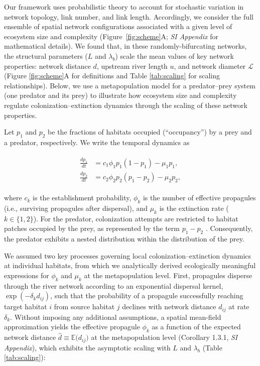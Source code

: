 \documentclass[11pt, class=article, crop=false]{standalone}
\theoremstyle{definition}
\begin{document}
Our framework uses probabilistic theory to account for stochastic variation in network topology, link number, and link length.
Accordingly, we consider the full ensemble of spatial network configurations associated with a given level of ecosystem size and complexity (Figure~\ref{fig:scheme}A; \textit{SI Appendix} for mathematical details). 
We found that, in these randomly-bifurcating networks, the structural parameters ($L$ and $\lambda_b$) scale the mean values of key network properties: network distance $d$, upstream river length $u$, and network diameter $\mathcal{L}$ (Figure \ref{fig:scheme}A for definitions and Table \ref{tab:scaling} for scaling relationships). 
Below, we use a metapopulation model for a predator–prey system (one predator and its prey) to illustrate how ecosystem size and complexity regulate colonization–extinction dynamics through the scaling of these network properties.

Let $p_{1}$ and $p_{2}$ be the fractions of habitats occupied (``occupancy'') by a prey and a predator, respectively.
We write the temporal dynamics as

\begin{align}
\begin{split}
    \frac{dp_{1}}{dt} &= c_1 \phi_1 p_1(1 - p_{1}) - \mu_{1} p_{1},\\
    \frac{dp_{2}}{dt} &= c_2 \phi_2 p_2 (p_{1} - p_{2}) - \mu_{2} p_{2},   
\end{split}
\label{eq:model-pp}
\end{align}

where $c_k$ is the establishment probability, $\phi_{k}$ is the number of effective propagules (i.e., surviving propagules after dispersal), and $\mu_{k}$ is the extinction rate ($k \in \{1,2\}$).
For the predator, colonization attempts are restricted to habitat patches occupied by the prey, as represented by the term $p_{1} - p_{2}$ \citep{holt_food_2002, takimoto_effects_2012, calcagno_constraints_2011}.
Consequently, the predator exhibits a nested distribution within the distribution of the prey.

We assumed two key processes governing local colonization--extinction dynamics at individual habitats, from which we analytically derived ecologically meaningful expressions for $\phi_k$ and $\mu_k$ at the metapopulation level. 
First, propagules disperse through the river network according to an exponential dispersal kernel, $\exp(-\delta_k d_{ij})$, such that the probability of a propagule successfully reaching target habitat $i$ from source habitat $j$ declines with network distance $d_{ij}$ at rate $\delta_k$.
Without imposing any additional assumptions, a spatial mean-field approximation \citep{ovaskainen_asymptotically_2006} yields the effective propagule $\phi_k$ as a function of the expected network distance $\hat{d} \equiv \mathbb{E}\bigl(d_{ij}\bigr)$ at the metapopulation level (Corollary 1.3.1, \textit{SI Appendix}), which exhibits the asymptotic scaling with $L$ and $\lambda_b$ (Table \ref{tab:scaling}):
\end{document}

